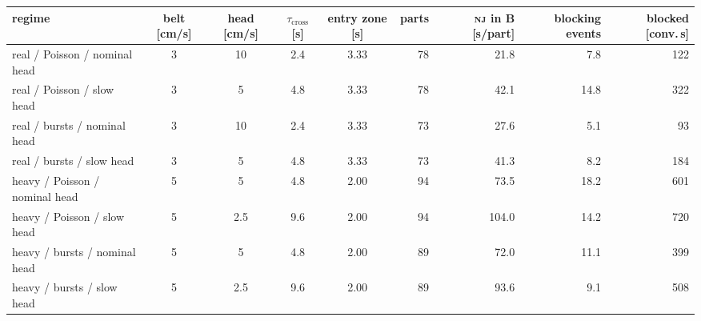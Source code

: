\begin{tabular}{@{}lccccrrrr@{}}
\toprule
regime & belt [cm/s] & head [cm/s] & $\tau_{\mathrm{cross}}$ [s] & entry zone [s] & parts & \textsc{nj} in B [s/part] & blocking events & blocked [conv.\,s] \\
\midrule
real / Poisson / nominal head & 3 & 10 & 2.4 & 3.33 & 78 & 21.8 & 7.8 & 122 \\
real / Poisson / slow head & 3 & 5 & 4.8 & 3.33 & 78 & 42.1 & 14.8 & 322 \\
real / bursts / nominal head & 3 & 10 & 2.4 & 3.33 & 73 & 27.6 & 5.1 & 93 \\
real / bursts / slow head & 3 & 5 & 4.8 & 3.33 & 73 & 41.3 & 8.2 & 184 \\
heavy / Poisson / nominal head & 5 & 5 & 4.8 & 2.00 & 94 & 73.5 & 18.2 & 601 \\
heavy / Poisson / slow head & 5 & 2.5 & 9.6 & 2.00 & 94 & 104.0 & 14.2 & 720 \\
heavy / bursts / nominal head & 5 & 5 & 4.8 & 2.00 & 89 & 72.0 & 11.1 & 399 \\
heavy / bursts / slow head & 5 & 2.5 & 9.6 & 2.00 & 89 & 93.6 & 9.1 & 508 \\
\bottomrule
\end{tabular}
